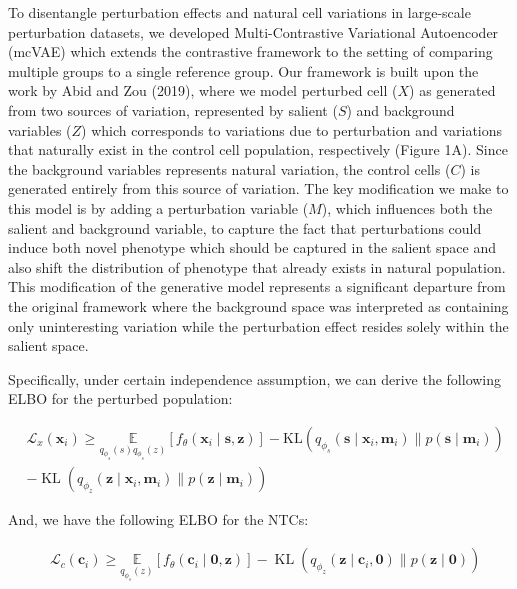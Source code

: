 \documentclass{article}
\begin{document}
To disentangle perturbation effects and natural cell variations in large-scale perturbation datasets, we developed Multi-Contrastive Variational Autoencoder (mcVAE) which extends the contrastive framework to the setting of comparing multiple groups to a single reference group. Our framework is built upon the work by Abid and Zou (2019), where we model perturbed cell ($X$) as generated from two sources of variation, represented by salient ($S$) and background variables ($Z$) which corresponds to variations due to perturbation and variations that naturally exist in the control cell population, respectively (Figure 1A). Since the background variables represents natural variation, the control cells ($C$) is generated entirely from this source of variation. The key modification we make to this model is by adding a perturbation variable ($M$), which influences both the salient and background variable, to capture the fact that perturbations could induce both novel phenotype which should be captured in the salient space and also shift the distribution of phenotype that already exists in natural population. This modification of the generative model represents a significant departure from the original framework where the background space was interpreted as containing only uninteresting variation while the perturbation effect resides solely within the salient space. 

Specifically, under certain independence assumption, we can derive the following ELBO for the perturbed population:

\begin{equation}
\begin{split}
& \mathcal{L}_x\left(\boldsymbol{x}_i\right) \geq \underset{q_{\phi_s}(s) q_{\phi_s}(z)}{\mathbb{E}}\left[f_\theta\left(\boldsymbol{x}_i \mid \boldsymbol{s}, \boldsymbol{z}\right)\right]
-\mathrm{KL}\left(q_{\phi_s}\left(\boldsymbol{s} \mid \boldsymbol{x}_i, \boldsymbol{m}_i\right) \| p\left(\boldsymbol{s} \mid \boldsymbol{m}_i\right)\right) \\
& -\operatorname{KL}\left(q_{\phi_z}\left(\boldsymbol{z} \mid \boldsymbol{x}_i, \boldsymbol{m}_i\right) \| p\left(\boldsymbol{z} \mid \boldsymbol{m}_i\right)\right) 
\end{split}
\end{equation}

And, we have the following ELBO for the NTCs:

\begin{equation}
\begin{split}
& \mathcal{L}_c\left(\boldsymbol{c}_i\right) \geq \underset{q_{\phi_s}(z)}{\mathbb{E}}\left[f_\theta\left(\boldsymbol{c}_i \mid \boldsymbol{0}, \boldsymbol{z}\right)\right] -\operatorname{KL}\left(q_{\phi_z}\left(\boldsymbol{z} \mid \boldsymbol{c}_i, \boldsymbol{0}\right) \| p\left(\boldsymbol{z} \mid \boldsymbol{0}\right)\right) 
\end{split}
\end{equation}
\end{document}
